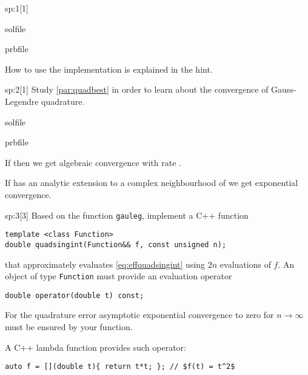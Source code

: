 \begin{samproblem}
\begin{subproblem}{sp:1}[1]
\begin{samwriteprbpart}{solfile}
\begin{writeverbatim}{prbfile}
\begin{samsolution}
        How to use the implementation is explained in the hint.
      \end{samsolution}
    \end{writeverbatim}
  \end{samwriteprbpart}
\end{subproblem}

\begin{subproblem}{sp:2}[1]
  Study \cref{par:quadbest} in order to learn about the convergence of
  Gauss-Legendre quadrature. 

  \begin{samwriteprbpart}{solfile}
    \begin{writeverbatim}{prbfile}
      \begin{samsolution}
        If  then we get algebraic convergence with rate .

        If  has an analytic extension to a complex neighbourhood of \Blue{$[a,b]$}
        we get exponential convergence.
      \end{samsolution}
    \end{writeverbatim}
  \end{samwriteprbpart}

\end{subproblem}

\begin{subproblem}{sp:3}[3] 
  Based on the function \verb|gauleg|, implement a C++ function
 \begin{lstlisting}[style=cpp]
template <class Function>
double quadsingint(Function&& f, const unsigned n);
 \end{lstlisting}
 that approximately evaluates \eqref{eq:effquadsingint} using $2n$ evaluations of $f$. 
 An object of type \verb|Function| must provide an evaluation operator
 \begin{lstlisting}[style=cpp]
double operator(double t) const;
 \end{lstlisting}
 For the quadrature error asymptotic exponential convergence to zero for
 $n \rightarrow \infty$ must be ensured by your function.
 
 
 \begin{samhint}
  A C++ lambda function provides such operator:
  \begin{lstlisting}[style=cpp]
auto f = [](double t){ return t*t; }; // $f(t) = t^2$
  \end{lstlisting}
 \end{samhint}
 

\end{subproblem}
\end{samproblem}
